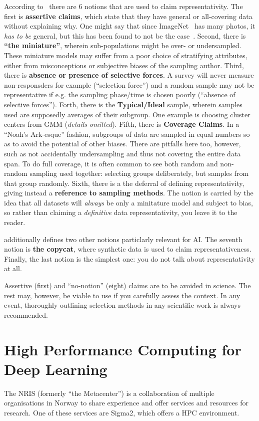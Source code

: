 \documentclass[10pt,twocolumn,letterpaper]{article}
\begin{document}
According to~\cite{krusk1,krusk2} there are 6 notions that are used to claim representativity.
The first is \textbf{assertive claims}, which state that they have general or all-covering data without explaining why. One might say that since ImageNet~\cite{imageNet} has many photos, it \textit{has to be} general, but this has been found to not be the case~\cite{biasedImagenet}.
Second, there is \textbf{``the miniature''}, wherein sub-populations might be over- or undersampled. These miniature models may suffer from a poor choice of stratifying attributes, either from misconceptions or subjective biases of the sampling author.
Third, there is \textbf{absence or presence of selective forces}. A survey will never measure non-responsders for example (``selection force'') and a random sample may not be representative if e.g. the sampling phase/time is chosen poorly (``absence of selective forces'').
Forth, there is the \textbf{Typical/Ideal} sample, wherein samples used are supposedly averages of their subgroup. One example is choosing cluster centers from \gls{GMM} (\textit{details omitted}).
Fifth, there is \textbf{Coverage Claims}. In a ``Noah's Ark-esque'' fashion, subgroups of data are sampled in equal numbers so as to avoid the potential of other biases. There are pitfalls here too, however, such as not accidentally undersampling and thus not covering the entire data span. To do full coverage, it is often common to see both random and non-random sampling used together: selecting groups deliberately, but samples from that group randomly.
Sixth, there is a the deferral of defining representativity, giving instead a \textbf{reference to sampling methods}. The notion is carried by the idea that all datasets will \textit{always} be only a minitature model and subject to bias, so rather than claiming a \textit{definitive} data representativity, you leave it to the reader. 

\cite{datarepresentativity} additionally defines two other notions particlarly relevant for \gls{AI}. The seventh notion is \textbf{the copycat}, where synthetic data is used to claim representativeness. Finally, the last notion is the simplest one: you do not talk about representativity at all. 

Assertive (first) and ``no-notion'' (eight) claims are to be avoided in science. The rest may, however, be viable to use if you carefully assess the context. In any event, thoroughly outlining selection methods in any scientific work is always recommended.

\section{High Performance Computing for Deep Learning}\label{sec:hpc}
The \gls{NRIS} (formerly ``the Metacenter'') is a collaboration of multiple organisations in Norway to share experience and offer services and resources for research. One of these services are Sigma2, which offers a \gls{HPC} environment.
\end{document}
